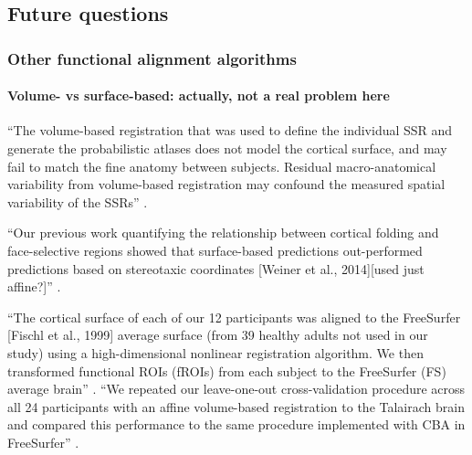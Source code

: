 \subsection{Future questions}


\subsubsection{Other functional alignment algorithms}

\paragraph{Volume- vs surface-based: actually, not a real problem here}



``The volume-based registration that was used to define the individual SSR and
generate the probabilistic atlases does not model the cortical surface,
and may fail to match the fine anatomy between subjects.
%
Residual macro-anatomical variability from volume-based registration may
confound the measured spatial variability of the SSRs''
\citep{zhen2017quantifying}.


``Our previous work quantifying the relationship between cortical folding and
face-selective regions showed that surface-based predictions out-performed
predictions based on stereotaxic coordinates [Weiner et al., 2014][used just
affine?]'' \citep{weiner2018defining}.

``The cortical surface of each of our 12 participants was aligned to the
FreeSurfer [Fischl et al., 1999] average surface (from 39 healthy adults not
used in our study) using a high-dimensional nonlinear registration algorithm.
%
We then transformed functional ROIs (fROIs) from each subject to the FreeSurfer
(FS) average brain'' \citep{weiner2018defining}.
%
``We repeated our leave-one-out cross-validation procedure across all 24
participants with an affine volume-based registration to the Talairach brain and
compared this performance to the same procedure implemented with CBA in
FreeSurfer'' \citep{weiner2018defining}.


